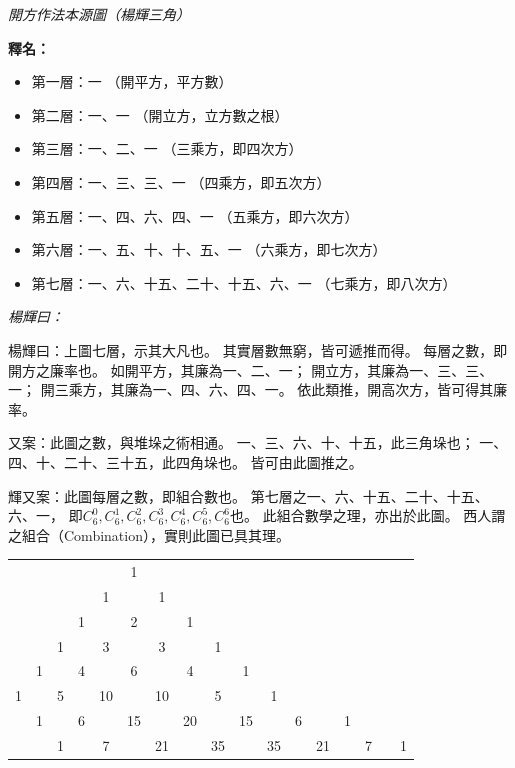 \documentclass[11pt,a4paper]{article}
\newenvironment{yanghuicomment}{%
  \par\noindent\textcolor{commentarycolor}{\small\textit{楊輝曰：}}%
  \ignorespaces
}{\par\vspace{0.5em}}
\begin{document}
\vspace{1em}

\begin{center}
\textit{開方作法本源圖（楊輝三角）}
\end{center}

\vspace{1.5em}

\noindent\textbf{釋名：}

\begin{itemize}[leftmargin=2em]
\item 第一層：一 \quad（開平方，平方數）
\item 第二層：一、一 \quad（開立方，立方數之根）
\item 第三層：一、二、一 \quad（三乘方，即四次方）
\item 第四層：一、三、三、一 \quad（四乘方，即五次方）
\item 第五層：一、四、六、四、一 \quad（五乘方，即六次方）
\item 第六層：一、五、十、十、五、一 \quad（六乘方，即七次方）
\item 第七層：一、六、十五、二十、十五、六、一 \quad（七乘方，即八次方）
\end{itemize}

\begin{yanghuicomment}
楊輝曰：上圖七層，示其大凡也。
其實層數無窮，皆可遞推而得。
每層之數，即開方之廉率也。
如開平方，其廉為一、二、一；
開立方，其廉為一、三、三、一；
開三乘方，其廉為一、四、六、四、一。
依此類推，開高次方，皆可得其廉率。

又案：此圖之數，與堆垛之術相通。
一、三、六、十、十五，此三角垛也；
一、四、十、二十、三十五，此四角垛也。
皆可由此圖推之。

輝又案：此圖每層之數，即組合數也。
第七層之一、六、十五、二十、十五、六、一，
即$C_6^0, C_6^1, C_6^2, C_6^3, C_6^4, C_6^5, C_6^6$也。
此組合數學之理，亦出於此圖。
西人謂之組合（Combination），實則此圖已具其理。
\end{yanghuicomment}

\vspace{1em}

\begin{center}
{\color{chartcolor}
\begin{tabular}{*{17}{c}}
& & & & & 1 & & & & & & & & & & & \\[0.6em]
& & & & 1 & & 1 & & & & & & & & & & \\[0.6em]
& & & 1 & & 2 & & 1 & & & & & & & & & \\[0.6em]
& & 1 & & 3 & & 3 & & 1 & & & & & & & & \\[0.6em]
& 1 & & 4 & & 6 & & 4 & & 1 & & & & & & & \\[0.6em]
1 & & 5 & & 10 & & 10 & & 5 & & 1 & & & & & & \\[0.6em]
& 1 & & 6 & & 15 & & 20 & & 15 & & 6 & & 1 & & & \\[0.6em]
& & 1 & & 7 & & 21 & & 35 & & 35 & & 21 & & 7 & & 1 \\
\end{tabular}
}
\end{center}
\end{document}
